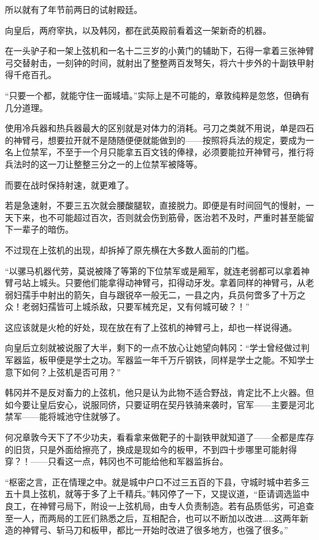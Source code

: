 所以就有了年节前两日的试射殿廷。

向皇后，两府宰执，以及韩冈，都在武英殿前看着这一架新奇的机器。

在一头驴子和一架上弦机和一名十二三岁的小黄门的辅助下，石得一拿着三张神臂弓交替射击，一刻钟的时间，就射出了整整两百发弩矢，将六十步外的十副铁甲射得千疮百孔。

“只要一个都，就能守住一面城墙。”实际上是不可能的，章敦纯粹是忽悠，但确有几分道理。

使用冷兵器和热兵器最大的区别就是对体力的消耗。弓刀之类就不用说，单是四石的神臂弓，想要拉开就不是随随便便就能做到的——按照将兵法的规定，要成为一名上位禁军，不至于一个月只能拿五百文钱的俸禄，必须要能拉开神臂弓，推行将兵法时的这一刀让整整三分之一的上位禁军被降等。

而要在战时保持射速，就更难了。

若是急速射，不要三五次就会腰酸腿软，直接脱力。即便是有时间回气的慢射，一天下来，也不可能超过百次，否则就会伤到筋骨，医治若不及时，严重时甚至能留下一辈子的暗伤。

不过现在上弦机的出现，却拆掉了原先横在大多数人面前的门槛。

“以骡马机器代劳，莫说被降了等第的下位禁军或是厢军，就连老弱都可以拿着神臂弓站上城头。只要他们能拿得动神臂弓，扣得动牙发。拿着同样的神臂弓，从老弱妇孺手中射出的箭矢，自与跟锐卒一般无二，一县之内，兵员何啻多了十万之众！老弱妇孺皆可上城杀敌，只要军械充足，又有何城可破？！”

这应该就是火枪的好处，现在放在有了上弦机的神臂弓上，却也一样说得通。

向皇后立刻就被说服了大半，剩下的一点不放心让她望向韩冈：“学士曾经做过判军器监，板甲便是学士之功。军器监一年千万斤钢铁，同样是学士之能。不知学士意下如何？上弦机是否可用？”

韩冈并不是反对畜力的上弦机，他只是认为此物不适合野战，肯定比不上火器。但如今要让皇后安心，说服同侪，只要证明在契丹铁骑来袭时，官军——主要是河北禁军——能将城池守住就够了。

何况章敦今天下了不少功夫，看看拿来做靶子的十副铁甲就知道了——全都是库存的旧货，只是外面给擦亮了，换成是现如今的板甲，不到四十步哪里可能射得穿？！——只看这一点，韩冈也不可能给他和军器监拆台。

“枢密之言，正在情理之中。就是城中户口不过三五百的下县，守城时城中若多三五十具上弦机，就等于多了上千精兵。”韩冈停了一下，又提议道，“臣请调选监中良工，在神臂弓局下，附设一上弦机局，由专人负责制造。若有品质低劣，可追查至一人，而两局的工匠们熟悉之后，互相配合，也可以不断加以改进……这两年新造的神臂弓、斩马刀和板甲，都比一开始时改进了很多地方，也强了很多。”

